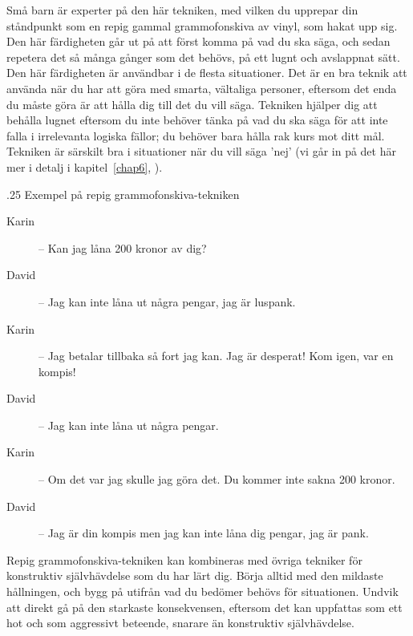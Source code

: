 \documentclass[swedish,a4paper]{book}
\makeatletter
\renewcommand\subsection{\@startsection{subsection}{1}{\z@}%
                                   {\baselineskip}%
                                   {.25\baselineskip}%
                                   {\fontsize{1\baselineskip}{1.25\baselineskip}\selectfont\sffamily\bfseries}} %
\makeatother
\begin{document}
Små barn är experter på den här tekniken, med vilken du upprepar din ståndpunkt som en repig gammal grammofonskiva av vinyl, som hakat upp sig. Den här färdigheten går ut på att först komma på vad du ska säga, och sedan repetera det så många gånger som det behövs, på ett lugnt och avslappnat sätt. Den här färdigheten är användbar i de flesta situationer. Det är en bra teknik att använda när du har att göra med smarta, vältaliga personer, eftersom det enda du måste göra är att hålla dig till det du vill säga. Tekniken hjälper dig att behålla lugnet eftersom du inte behöver tänka på vad du ska säga för att inte falla i irrelevanta logiska fällor; du behöver bara hålla rak kurs mot ditt mål. Tekniken är särskilt bra i situationer när du vill säga 'nej' (vi går in på det här mer i detalj i kapitel~\ref{chap6}, \textit{}).

\subsection{Exempel på repig grammofonskiva-tekniken}

\begin{description}

\item[Karin] -- Kan jag låna 200 kronor av dig?

\item[David] -- Jag kan inte låna ut några pengar, jag är luspank.

\item[Karin] -- Jag betalar tillbaka så fort jag kan. Jag är desperat! Kom igen, var en kompis!

\item[David] -- Jag kan inte låna ut några pengar.

\item[Karin] -- Om det var jag skulle jag göra det. Du kommer inte sakna 200 kronor.

\item[David] -- Jag är din kompis men jag kan inte låna dig pengar, jag är pank.

\end{description}

Repig grammofonskiva-tekniken kan kombineras med övriga tekniker för konstruktiv självhävdelse som du har lärt dig. Börja alltid med den mildaste hållningen, och bygg på utifrån vad du bedömer behövs för situationen. Undvik att direkt gå på den starkaste konsekvensen, eftersom det kan uppfattas som ett hot och som aggressivt beteende, snarare än konstruktiv självhävdelse.
\end{document}
